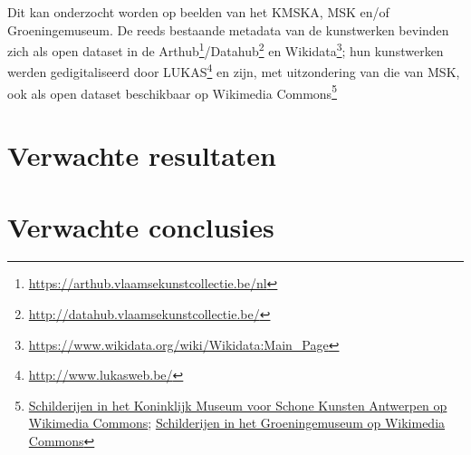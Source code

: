 \documentclass[fleqn,10pt]{voorstel}
\begin{document}
Dit kan onderzocht worden op beelden van het KMSKA, MSK en/of Groeningemuseum. De reeds bestaande metadata van de kunstwerken bevinden zich als open dataset in de Arthub\footnote{\url{https://arthub.vlaamsekunstcollectie.be/nl}}/Datahub\footnote{\url{http://datahub.vlaamsekunstcollectie.be/}} en Wikidata\footnote{\url{https://www.wikidata.org/wiki/Wikidata:Main_Page}}; hun kunstwerken werden gedigitaliseerd door LUKAS\footnote{\url{http://www.lukasweb.be/}} en zijn, met uitzondering van die van MSK, ook als open dataset beschikbaar op Wikimedia Commons\footnote{\href{https://commons.wikimedia.org/wiki/Paintings_in_the_Royal_Museum_of_Fine_Arts_Antwerp}{Schilderijen in het Koninklijk Museum voor Schone Kunsten Antwerpen op Wikimedia Commons}; \href{https://commons.wikimedia.org/wiki/Paintings_in_the_Groeningemuseum}{Schilderijen in het Groeningemuseum op Wikimedia Commons}}

\section{Verwachte resultaten}
\label{sec:verwachte_resultaten}



\section{Verwachte conclusies}
\label{sec:verwachte_conclusies}





\printbibliography[heading=bibintoc]
\end{document}
